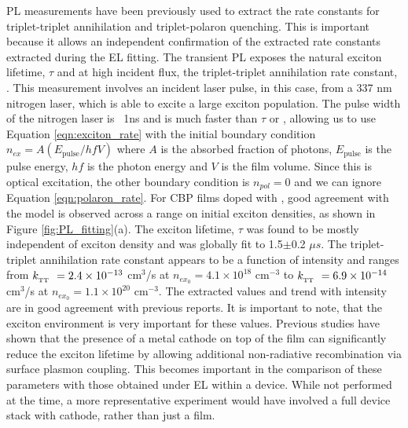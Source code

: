 \documentclass[../thesis.tex]{subfiles}
\begin{document}
PL measurements have been previously used to extract the rate constants for triplet-triplet annihilation and triplet-polaron quenching.\supercite{Erickson2014,Reineke2007}
This is important because it allows an independent confirmation of the extracted rate constants extracted during the EL fitting.
The transient PL exposes the natural exciton lifetime, $\tau$ and at high incident flux, the triplet-triplet annihilation rate constant, \ktt.
This measurement involves an incident laser pulse, in this case, from a 337 nm nitrogen laser, which is able to excite a large exciton population.
The pulse width of the nitrogen laser is ~1ns and is much faster than $\tau$ or \ktt, allowing us to use Equation \ref{eqn:exciton_rate} with the initial boundary condition $n_{ex}=A(E_{\text{pulse}}/hfV)$ where $A$ is the absorbed fraction of photons, $E_{\text{pulse}}$ is the pulse energy, $hf$ is the photon energy and $V$ is the film volume.
Since this is optical excitation, the other boundary condition is $n_{pol}=0$ and we can ignore Equation \ref{eqn:polaron_rate}.\supercite{Reineke2007,Erickson2014,Baldo2000a}
For CBP films doped with \irppy, good agreement with the model is observed across a range on initial exciton densities, as shown in Figure \ref{fig:PL_fitting}(a).
The exciton lifetime, $\tau$ was found to be mostly independent of exciton density and was globally fit to 1.5$\pm$0.2 $\mu s$.  
The triplet-triplet annihilation rate constant appears to be a function of intensity and ranges from $k_{_\text{\tiny TT}}\ =2.4\times10^{-13}$ cm$^3$/s at $n_{ex_0}=4.1\times10^{18}$ cm$^{-3}$ to $k_{_\text{\tiny TT}}\ =6.9\times10^{-14}$ cm$^3$/s at $n_{ex_0}=1.1\times10^{20}$ cm$^{-3}$.
The extracted values and trend with intensity are in good agreement with previous reports.\supercite{Reineke2007,Erickson2014,Staroske2007}
It is important to note, that the exciton environment is very important for these values.  
Previous studies have shown that the presence of a metal cathode on top of the film can significantly reduce the exciton lifetime by allowing additional non-radiative recombination via surface plasmon coupling.\supercite{Song2011}
This becomes important in the comparison of these parameters with those obtained under EL within a device.
While not performed at the time, a more representative experiment would have involved a full device stack with cathode, rather than just a film.  
\end{document}
